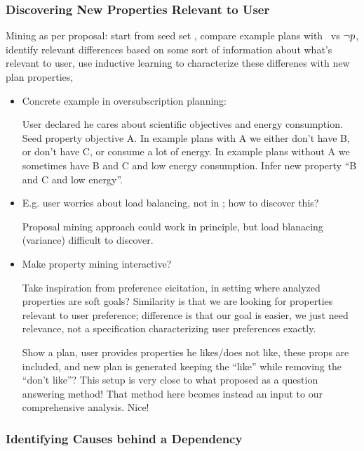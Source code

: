\subsubsection{Discovering New Properties Relevant to User}

Mining as per proposal: start from seed set \props, compare example
plans with \prop\ vs $\neg p$, identify relevant differences based
on some sort of information about what's relevant to user, use
inductive learning to characterize these differenes with new plan
properties,

\begin{itemize}
\item Concrete example in oversubscription planning:

  User declared he cares about scientific objectives and energy
  consumption. Seed property objective A. In example plans with A we
  either don't have B, or don't have C, or consume a lot of energy. In
  example plans without A we sometimes have B and C and low energy
  consumption. Infer new property ``B and C and low energy''.

\item E.g. user worries about load balancing, not in \props; how to
  discover this?

  Proposal mining approach could work in principle, but load blanacing
  (variance) difficult to discover.

\item Make property mining interactive?

  Take inspiration from preference eicitation, in setting where
  analyzed properties are soft goals? Similarity is that we are
  looking for properties relevant to user preference; difference is
  that our goal is easier, we just need relevance, not a specification
  characterizing user preferences exactly.

   Show a plan, user provides
  properties he likes/does not like, these props are included, and new
  plan is generated keeping the ``like'' while removing the ``don't
  like''?  This setup is very close to what
  \cite{fox:etal:ijcai-ws-17} proposed as a question answering method!
  That method here bcomes instead an input to our comprehensive
  analysis. Nice!

\end{itemize}




\subsubsection{Identifying Causes behind a Dependency}

